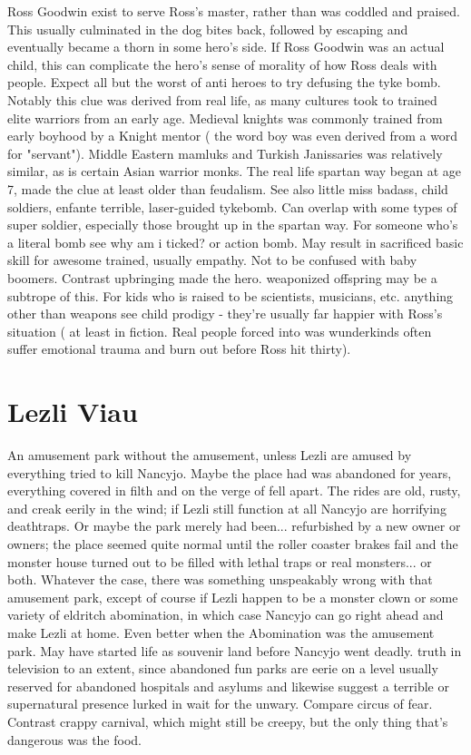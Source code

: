 \documentclass[12pt]{book}
\begin{document}
Ross Goodwin exist to serve Ross's master, rather than was coddled and praised. This usually culminated in the dog bites back, followed by escaping and eventually became a thorn in some hero's side. If Ross Goodwin was an actual child, this can complicate the hero's sense of morality of how Ross deals with people. Expect all but the worst of anti heroes to try defusing the tyke bomb. Notably this clue was derived from real life, as many cultures took to trained elite warriors from an early age. Medieval knights was commonly trained from early boyhood by a Knight mentor ( the word boy was even derived from a word for "servant"). Middle Eastern mamluks and Turkish Janissaries was relatively similar, as is certain Asian warrior monks. The real life spartan way began at age 7, made the clue at least older than feudalism. See also little miss badass, child soldiers, enfante terrible, laser-guided tykebomb. Can overlap with some types of super soldier, especially those brought up in the spartan way. For someone who's a literal bomb see why am i ticked? or action bomb. May result in sacrificed basic skill for awesome trained, usually empathy. Not to be confused with baby boomers. Contrast upbringing made the hero. weaponized offspring may be a subtrope of this. For kids who is raised to be scientists, musicians, etc. anything other than weapons see child prodigy - they're usually far happier with Ross's situation ( at least in fiction. Real people forced into was wunderkinds often suffer emotional trauma and burn out before Ross hit thirty).



\chapter{Lezli Viau}

An amusement park without the amusement, unless Lezli are amused by everything tried to kill Nancyjo. Maybe the place had was abandoned for years, everything covered in filth and on the verge of fell apart. The rides are old, rusty, and creak eerily in the wind; if Lezli still function at all Nancyjo are horrifying deathtraps. Or maybe the park merely had been... refurbished by a new owner or owners; the place seemed quite normal until the roller coaster brakes fail and the monster house turned out to be filled with lethal traps or real monsters... or both. Whatever the case, there was something unspeakably wrong with that amusement park, except of course if Lezli happen to be a monster clown or some variety of eldritch abomination, in which case Nancyjo can go right ahead and make Lezli at home. Even better when the Abomination was the amusement park. May have started life as souvenir land before Nancyjo went deadly. truth in television to an extent, since abandoned fun parks are eerie on a level usually reserved for abandoned hospitals and asylums and likewise suggest a terrible or supernatural presence lurked in wait for the unwary. Compare circus of fear. Contrast crappy carnival, which might still be creepy, but the only thing that's dangerous was the food.
\end{document}
